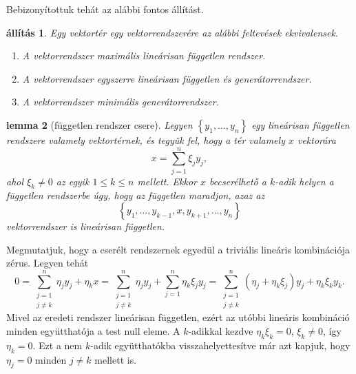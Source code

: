 \documentclass[a4paper, showtrims]{memoir}
\makeatletter
\renewenvironment{proof}[1][\proofname]
    {\par\pushQED{\qed}%
    \normalfont \topsep6\p@\@plus6\p@\relax
    \trivlist
    \item[\hskip\labelsep
        \itshape
    #1\@addpunct{:}]\ignorespaces}
    {\popQED\endtrivlist\@endpefalse}
\theoremstyle{plain}
\newtheorem{proposition}{állítás}[chapter]
\newtheorem{lemma}[proposition]{lemma}
\theoremstyle{remark}
\theoremstyle{definition}
\makeatother
\begin{document}
Bebizonyítottuk tehát az alábbi fontos állítást.
\begin{proposition}
	Egy vektortér egy vektorrendszerére az alábbi feltevések ekvivalensek.
	\begin{enumerate}
		\item A vektorrendszer maximális lineárisan független rendszer.
		\item A vektorrendszer egyszerre lineárisan független és generátorrendszer.
		\item A vektorrendszer minimális generátorrendszer.\qedhere
	\end{enumerate}
    \label{pr:maxmin}
\end{proposition}
\begin{lemma}[független rendszer csere]\label{le:fgtlncsere}
	Legyen $\left\{ y_1,\ldots,y_n \right\}$ egy lineárisan független rendszere valamely vektortérnek,
	és tegyük fel, hogy a tér valamely $x$ vektorára
	\[
		x=\sum_{j=1}^n\xi_jy_j,
	\]
	ahol $\xi_k\neq 0$ az egyik $1\leq k\leq n$ mellett.
	Ekkor $x$ becserélhető a $k$-adik helyen a független rendszerbe
	úgy, hogy az független maradjon, azaz az
	\[
		\left\{ y_1,\ldots,y_{k-1},x,y_{k+1},\ldots,y_n \right\}
	\]
	vektorrendszer is lineárisan független.
\end{lemma}
\begin{proof}
	Megmutatjuk, hogy a cserélt rendszernek egyedül a triviális lineáris kombinációja zérus.
	Legyen tehát
	\[
		0
		=\sum_{\substack{j=1\\j\neq k}}^n\eta_jy_j+\eta_kx
		=\sum_{\substack{j=1\\j\neq k}}^n\eta_jy_j+\sum_{j=1}^n\eta_k\xi_jy_j
		=\sum_{\substack{j=1\\j\neq k}}^n\left( \eta_j+\eta_k\xi_j \right)y_j+\eta_k\xi_ky_k.
	\]
	Mivel az eredeti rendszer lineárisan független,
	ezért az utóbbi lineáris kombináció minden együtthatója a test null eleme.
	A $k$-adikkal kezdve $\eta_k\xi_k=0$, $\xi_k\neq 0$, így $\eta_k=0$.
	Ezt a nem $k$-adik együtthatókba visszahelyettesítve
	már azt kapjuk, hogy $\eta_j=0$ minden $j\neq k$ mellett is.
\end{proof}
\end{document}
